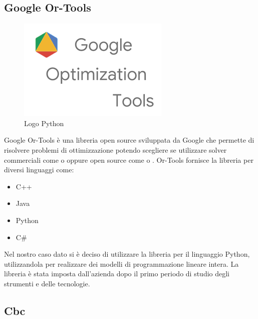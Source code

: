 \subsection{Google Or-Tools}
\begin{figure}[H]
	\begin{center} \includegraphics[scale=0.8]{figures/google_or_tools}
		\caption[Bin packing figures]{Logo Python}  
	\end{center}
\end{figure}
Google Or-Tools è una libreria open source sviluppata da Google che permette di risolvere problemi di ottimizzazione potendo scegliere se utilizzare solver commerciali come  o  oppure open source come  o . Or-Tools fornisce la libreria per diversi linguaggi come:
\begin{itemize}
	\item C++
	\item Java
	\item Python
	\item C\#
\end{itemize}
Nel nostro caso dato si è deciso di utilizzare la libreria per il linguaggio Python, utilizzandola per realizzare dei modelli di programmazione lineare intera. La libreria è stata imposta dall'azienda dopo il primo periodo di studio degli strumenti e delle tecnologie.

\subsection{Cbc}

